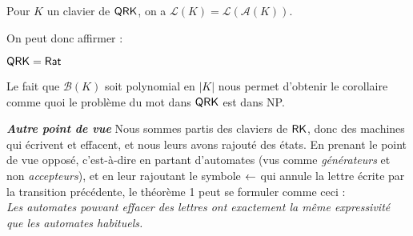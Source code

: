 \documentclass[12pt, a4paper]{article}
\renewcommand{\L}{\mathcal{L}}
\newcommand{\A}{\mathcal{A}}
\newcounter{thm}
\begin{document}
    \begin{bisimautomclav}\label{lklak}
        Pour $K$ un clavier de $\mathsf{QRK}$, on a $\L(K) = \L(\A(K))$.
    \end{bisimautomclav}
    \vspace{10pt}
    On peut donc affirmer :
    \begin{QRKegalRat}\label{th1}
        $\mathsf{QRK} = \mathsf{Rat}$
    \end{QRKegalRat}
    Le fait que $\mathcal{B}(K)$ soit polynomial en $|K|$ nous permet d'obtenir le corollaire comme quoi le problème du mot dans $\mathsf{QRK}$ est dans NP.
    \begin{thmbox}[L]{\textbf{\emph{Autre point de vue}}}
        Nous sommes partis des claviers de $\mathsf{RK}$, donc des machines qui écrivent et effacent, et nous leurs avons rajouté des états.
        En prenant le point de vue opposé, c'est-à-dire en partant d'automates (vus comme \emph{générateurs} et non \emph{accepteurs}), et en leur rajoutant le symbole $\mathord{\leftarrow}$ qui annule la lettre écrite par la transition précédente, le théorème 1 peut se formuler comme ceci : \\
        \emph{Les automates pouvant effacer des lettres ont exactement la même expressivité que les automates habituels.}
    \end{thmbox}
\end{document}
